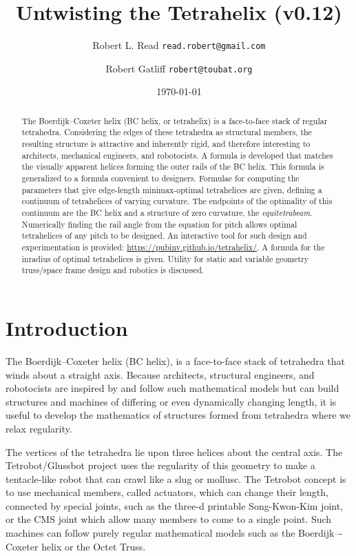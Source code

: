 \documentclass[11pt]{article}
\title{Untwisting the Tetrahelix (v0.12)}
\author{Robert L. Read \texttt{read.robert@gmail.com} \and
  Robert Gatliff \texttt{robert@toubat.org}
}
\date{\today}
\begin{document}
\maketitle


\begin{abstract}
  The Boerdijk--Coxeter helix (BC helix, or tetrahelix) is a
  face-to-face stack of regular tetrahedra.  Considering the edges of
  these tetrahedra as structural members, the resulting structure is attractive and
  inherently rigid, and therefore interesting to architects,
  mechanical engineers, and robotocists.  A formula is developed that matches the
  visually apparent helices forming the outer rails of the BC helix.
  This formula is generalized to a formula convenient to designers.
  Formulae for 
  computing the
  parameters that give edge-length minimax-optimal tetrahelices
  are given, defining a continuum of tetrahelices of varying curvature.
  The endpoints of the optimality of this continuum are the BC helix and
  a structure of zero curvature, the \emph{equitetrabeam}.
  Numerically finding the rail angle from the equation for
  pitch allows optimal tetrahelices of any pitch to be designed. 
  An interactive tool for such design and experimentation is provided: \url{https://pubinv.github.io/tetrahelix/}.
  A formula for the inradius of optimal tetrahelices is given.
  Utility for static and variable geometry
  truss/space frame design and robotics is discussed.
\end{abstract}


\section{Introduction}

The Boerdijk--Coxeter helix\cite{coxeter1985simplicial} (BC helix), is
a face-to-face stack of tetrahedra that winds about a straight axis.
Because architects, structural engineers, and robotocists are inspired
by and follow such mathematical models but can build structures and
machines of differing or even dynamically changing length, it is
useful to develop the mathematics of structures formed from tetrahedra
where we relax regularity.


The vertices of the tetrahedra lie upon
three helices about the central axis.  The
Tetrobot/Glussbot\cite{TetrobotBook} project uses the regularity of
this geometry to make a tentacle-like robot that can crawl like a slug
or mollusc.  The Tetrobot concept is to use mechanical members, called
actuators, which can change their length, connected by special joints,
such as the three-d printable Song-Kwon-Kim\cite{song2003spherical} joint, or the CMS joint\cite{HamlinSandersonCMS}
which allow many members to come to a single point.
Such machines can
follow purely regular mathematical models such as the Boerdijk–-Coxeter
helix or the Octet Truss\cite{richard1961synergetic}.
\end{document}
